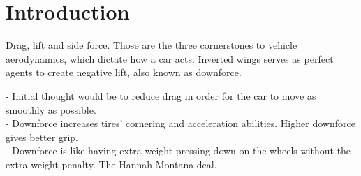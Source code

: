 \chapter{Introduction}
Drag, lift and side force. Those are the three cornerstones to vehicle aerodynamics, which dictate how a car acts. Inverted wings serves as perfect agents to create negative lift, also known as downforce.

- Initial thought would be to reduce drag in order for the car to move as smoothly as possible. \cite{jkatz}\\
- Downforce increases tires' cornering and acceleration abilities. Higher downforce gives better grip.\\
- Downforce is like having extra weight pressing down on the wheels without the extra weight penalty. The Hannah Montana deal.

